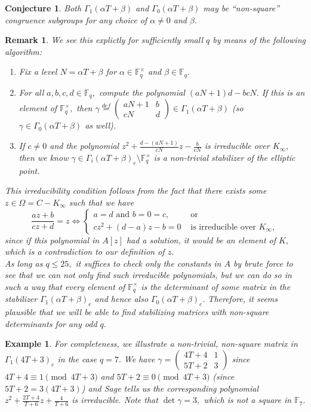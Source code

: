 \documentclass[11pt]{amsart}
\newtheorem{conjecture}[theorem]{Conjecture}
\newtheorem{example}[theorem]{Example}
\newtheorem{remark}[theorem]{Remark}
\theoremstyle{definition}
\numberwithin{equation}{section}
\newcommand{\cN}{\mathcal{N}}		%
\newcommand{\bbF}{\mathbb{F}}		%
\begin{document}
\begin{conjecture}	
		Both $\Gamma_1(\alpha T+\beta)$ and $\Gamma_0(\alpha T+\beta)$ may be ``non-square'' congruence subgroups for any choice of $\alpha\neq 0$ and $\beta.$ 
\end{conjecture}
\begin{remark}
	We see this explictly for sufficiently small $q$ by means of the following algorithm:
	\begin{enumerate}
		\item Fix a level $N=\alpha T+\beta$ for $\alpha\in \bbF_q^{\times}$ and $\beta\in \bbF_q.$
		\item For all $a,b,c,d\in \bbF_q,$ compute the polynomial $(aN+1)d-bcN.$ If this is an element of $\bbF_q^{\times},$ then $\displaystyle{\gamma\overset{def}{=}\left(\begin{array}{cc} aN+1&b\\cN&d\end{array}\right)\in \Gamma_1(\alpha T+\beta)}$ (so $\gamma\in \Gamma_0(\alpha T+\beta)$ as well).
		\item If $c\neq 0$ and the polynomial $\displaystyle{z^2+\frac{d-(aN+1)}{cN}z-\frac{b}{cN}}$ is irreducible over $K_{\infty},$ then we know $\gamma\in \Gamma_i(\alpha T+\beta)_e\setminus \bbF_q^{\times}$ is a non-trivial stabilizer of the elliptic point. 
	\end{enumerate}
	This irreducibility condition follows from the fact that there exists some $z\in \Omega = C-K_{\infty}$ such that we have 
	\[\frac{az+b}{cz+d}=z \iff \begin{cases}
	a=d \text{ and } b=0=c, &\text{ or }\\
	cz^2+(d-a)z-b=0 & \text{ is irreducible over }K_{\infty},
	\end{cases}\] since if this polynomial in $A[z]$ had a solution, it would be an element of $K,$ which is a contradiction to our definition of $z.$\\
	
	As long as $q\leq 25,$ it suffices to check only the constants in $A$ by brute force to see that we can not only find such irreducible polynomials, but we can do so in such a way that every element of $\bbF_q^{\times}$ is the determinant of some matrix in the stabilizer $\Gamma_1(\alpha T+\beta)_e$ and hence also $\Gamma_0(\alpha T+\beta)_e.$ Therefore, it seems plausible that we will be able to find stabilizing matrices with non-square determinants for any odd $q.$  
\end{remark}
\begin{example}
	For completeness, we illustrate a non-trivial, non-square matrix in $\Gamma_1(4T+3)_e$ in the case $q=7.$ We have $\displaystyle{\gamma=\left(\begin{array}{cc}4T+4&1\\5T+2&3\end{array}\right)}$ since $4T+4\equiv 1\pmod{4T+3}$ and $5T+2\equiv 0\pmod{4T+3}$ (since $5T+2=3(4T+3)$) and Sage tells us the corresponding polynomial $\displaystyle{z^2+\frac{2T+4}{T+6}z+\frac{4}{T+6}}$ is irreducible. Note that $\det\gamma = 3,$ which is not a square in $\bbF_7.$
\end{example}
\end{document}
